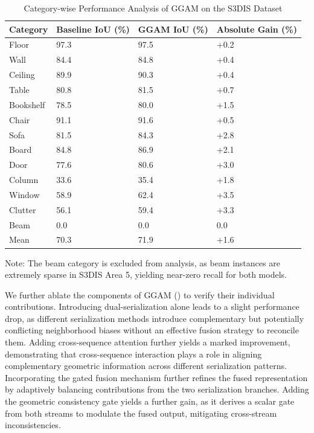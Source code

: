 \documentclass[a4paper,fleqn]{cas-sc}
\begin{document}
\begin{table}[!t]
	\centering
	\caption{Category-wise Performance Analysis of GGAM on the S3DIS Dataset}
	\label{tab:ggam_category}
	\begin{tabular}{llll}
		\toprule
		\textbf{Category} & \textbf{Baseline IoU (\%)} & \textbf{GGAM IoU (\%)} & \textbf{Absolute Gain (\%)} \\
		\midrule
		Floor     & 97.3  & 97.5  & +0.2 \\
		Wall      & 84.4  & 84.8  & +0.4 \\
		Ceiling   & 89.9  & 90.3  & +0.4 \\
		Table     & 80.8  & 81.5  & +0.7 \\
		Bookshelf & 78.5  & 80.0  & +1.5 \\
		Chair     & 91.1  & 91.6  & +0.5 \\
		Sofa      & 81.5  & 84.3  & +2.8 \\
		Board     & 84.8  & 86.9  & +2.1 \\
		Door      & 77.6  & 80.6  & +3.0 \\
		Column    & 33.6  & 35.4  & +1.8 \\
		Window    & 58.9  & 62.4  & +3.5 \\
		Clutter   & 56.1  & 59.4  & +3.3 \\
		Beam      & 0.0   & 0.0   & 0.0   \\
		\midrule
		Mean      & 70.3  & 71.9  & +1.6 \\
		\bottomrule
	\end{tabular}
	\par\vspace{3pt}
	\footnotesize Note: The beam category is excluded from analysis, as beam instances are extremely sparse in S3DIS Area 5, yielding near-zero recall for both models.
\end{table}

We further ablate the components of GGAM () to verify their individual contributions.
Introducing dual-serialization alone leads to a slight performance drop, as different serialization methods introduce complementary but potentially conflicting neighborhood biases without an effective fusion strategy to reconcile them. Adding cross-sequence attention further yields a marked improvement, demonstrating that cross-sequence interaction plays a role in aligning complementary geometric information across different serialization patterns. Incorporating the gated fusion mechanism further refines the fused representation by adaptively balancing contributions from the two serialization branches. Adding the geometric consistency gate yields a further gain, as it derives a scalar gate from both streams to modulate the fused output, mitigating cross-stream inconsistencies.
\end{document}
